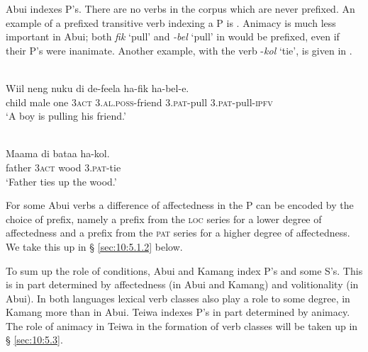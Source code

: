 Abui  indexes P's. There are no verbs in the corpus which are never prefixed. An example of a prefixed transitive verb indexing a P is . Animacy  is much less important in Abui; both \textit{fik} `pull' and \textit{{}-bel} `pull' in  would be prefixed, even if their P's were inanimate. Another example, with the verb -\textit{kol} `tie', is given in .


\ea%
\label{bkm:Ref306280933}
 \\ 
\gll    Wiil  neng  nuku  di  de-feela  ha-fik    ha-bel-e.      \\  
     child  male  one  3\textsc{act} 3.\textsc{al.poss}{}-friend  3.\textsc{pat}{}-pull  3\textsc{.pat}{}-pull-\textsc{ipfv}  \\
\glt  `A boy is pulling his friend.'  
\z









   


\ea%
\label{bkm:Ref383697305}
 \\ 
\gll   Maama  di  bataa  ha-kol. \\  
     father  3\textsc{act} wood  3.\textsc{pat}{}-tie \\
\glt  `Father ties up the wood.'
\z







For some Abui  verbs a difference of affectedness  in the P can be encoded by the choice of prefix, namely a prefix from the \textsc{loc} series for a lower degree of affectedness and a prefix from the \textsc{pat} series for a higher degree of affectedness. We take this up in {\S} \ref{sec:10:5.1.2} below.

To sum up the role of conditions, Abui and Kamang index P's and some S's. This is in part determined by affectedness (in Abui and Kamang) and volitionality (in Abui). In both languages lexical verb classes also play a role to some degree, in Kamang more than in Abui. Teiwa  indexes P's in part determined by animacy. The role of animacy in Teiwa in the formation of verb classes will be taken up in {\S} \ref{sec:10:5.3}.

